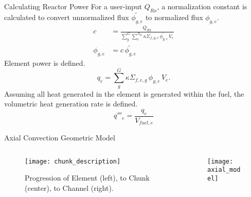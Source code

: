 \begin{frame}{Calculating Reactor Power}
  For a user-input $Q_{Rx}$, a normalization constant is calculated to convert
  unnormalized flux $\widetilde{\phi_{g,e}}$ to normalized flux $\phi_{g,e}$.
  \begin{align}
    \label{eq:normalization_c}
    c &= \frac{Q_{Rx}}{\sum_{g}^{G} \sum_{e}^{N_E} \kappa \Sigma_{f,g,e} \,
      \widetilde{\phi_{g,e}} \, V_e} \\
    \phi_{g,e} &= c \, \widetilde{\phi_{g,e}}
  \end{align}
  Element power is defined.
  \begin{equation}
    \label{eq:elementpwr}
    q_{e} = \sum_g^G \kappa \Sigma_{f,e,g} \, \phi_{g,e} \, V_e .
  \end{equation}
  Assuming all heat generated in the element is generated within the fuel, the
  volumetric heat generation rate is defined.
  \begin{equation}
    \label{eq:elementqppp_fuel}
    q'''_{e} = \frac{q_e}{V_{fuel,e}}
  \end{equation}
\end{frame}

\begin{frame}{Axial Convection Geometric Model}
  \begin{columns}
    \begin{column}{0.5\textwidth}
      \begin{figure}
        \centering
        \texttt{[image: chunk\_description]}
        \caption{Progression of Element (left), to Chunk (center), to Channel
          (right).}
        \label{fig:chunk_description}
      \end{figure}
    \end{column}
    \begin{column}{0.5\textwidth}
      \begin{figure}
        \centering
        \texttt{[image: axial\_model]}
        \label{fig:axial_model}
      \end{figure}
    \end{column}
  \end{columns}
\end{frame}

